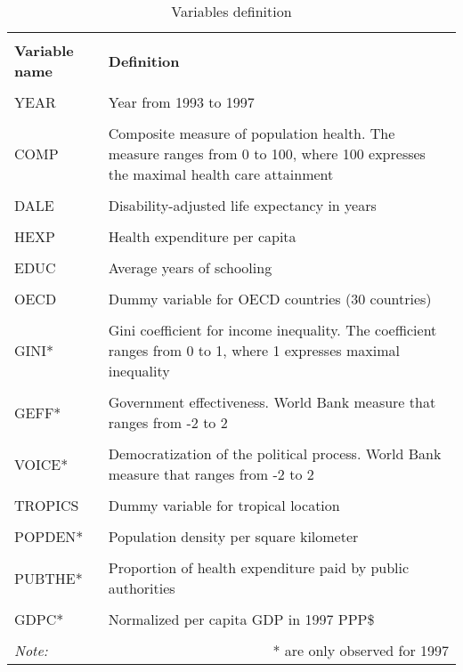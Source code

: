 \documentclass[12pt,a4paper]{article}\usepackage[]{graphicx}\usepackage[]{color}
\begin{document}
\begin{table}[htbp] \centering 

  \caption{Variables definition} 
  \label{Variables definition} 
  \footnotesize
\begin{tabular}{p{3cm} p{9cm}} 
\\[-1.8ex]\hline 
\hline \\[-1.8ex] 
\textbf{Variable name} & \textbf{Definition} \\ 
\hline \\[-1.8ex] 

YEAR & Year from 1993 to 1997 \\
\hline \\[-1.8ex]
COMP & Composite measure of population health. The measure ranges from 0 to 100, where 100 expresses the maximal health care attainment \\
\hline \\[-1.8ex]
DALE & Disability-adjusted life expectancy in years \\
\hline \\[-1.8ex]
HEXP & Health expenditure per capita \\
\hline \\[-1.8ex]
EDUC & Average years of schooling \\
\hline \\[-1.8ex]
OECD & Dummy variable for OECD countries (30 countries) \\
\hline \\[-1.8ex]
GINI* & Gini coefficient for income inequality. The coefficient ranges from 0 to 1, where 1 expresses maximal inequality \\
\hline \\[-1.8ex]
GEFF* & Government effectiveness. World Bank measure that ranges from -2 to 2 \\
\hline \\[-1.8ex]
VOICE* & Democratization of the political process. World Bank measure that ranges from -2 to 2 \\
\hline \\[-1.8ex]
TROPICS & Dummy variable for tropical location \\
\hline \\[-1.8ex]
POPDEN* & Population density per square kilometer \\
\hline \\[-1.8ex]
PUBTHE* & Proportion of health expenditure paid by public authorities \\
\hline \\[-1.8ex]
GDPC* & Normalized per capita GDP in 1997 PPP\$ \\
\hline

\hline \\[-1.8ex] 
\textit{Note:} & \multicolumn{1}{r}{* are only observed for 1997} \\ 
\end{tabular} 
\end{table} 
\normalsize
\end{document}
